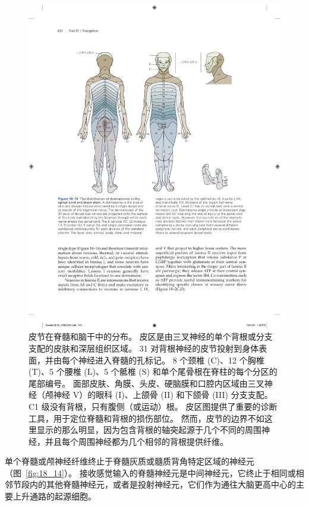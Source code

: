 \begin{figure}[htbp]
	\centering
	\includegraphics[width=1.0\linewidth]{chap18/fig_18_13}
	\caption{皮节在脊髓和脑干中的分布。 
		皮区是由三叉神经的单个背根或分支支配的皮肤和深层组织区域。 
		31 对背根神经的皮节投射到身体表面，并由每个神经进入脊髓的孔标记。 
		8 个颈椎 (C)、12 个胸椎 (T)、5 个腰椎 (L)、5 个骶椎 (S) 和单个尾骨根在脊柱的每个分区的尾部编号。 
		面部皮肤、角膜、头皮、硬脑膜和口腔内区域由三叉神经（颅神经 V）的眼科 (I)、上颌骨 (II) 和下颌骨 (III) 分支支配。 
		C1 级没有背根，只有腹侧（或运动）根。 
		皮区图提供了重要的诊断工具，用于定位脊髓和背根的损伤部位。 
		然而，皮节的边界不如这里显示的那么明显，因为包含背根的轴突起源于几个不同的周围神经，并且每个周围神经都为几个相邻的背根提供纤维。}
	\label{fig:18_13}
\end{figure}


单个脊髓或颅神经纤维终止于脊髓灰质或髓质背角特定区域的神经元（图~\ref{fig:18_14}）。
接收感觉输入的脊髓神经元是中间神经元，它终止于相同或相邻节段内的其他脊髓神经元，或者是投射神经元，它们作为通往大脑更高中心的主要上升通路的起源细胞。


